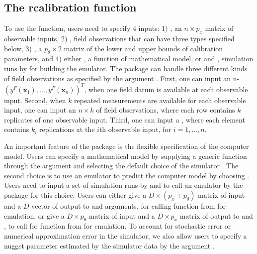  \subsection{The rcalibration function} 
To use the   function, users need to specify 4 inputs: 1) , an $n\times p_x$ matrix of observable inputs, 2) , field observations that can have three types specified below,  3) , a $p_{\theta}\times 2$ matrix of the lower and upper bounds of calibration parameters, and 4) either , a function of mathematical model, or  and , simulation runs by for building the emulator. The  package can handle three different kinds of field observations as specified by the argument . First, one can input an n- $(y^F(\mathbf x_1),...,y^F(\mathbf x_n))^T$, when one field datum is available at each observable input. Second, when $k$ repeated measurements are available for each observable input, one can input an $n\times k$  of field observations, where each row contains $k$ replicates of one observable input. Third, one can input a , where each element contains  $k_i$ replications at the $i$th observable input, for $i=1,...,n$. 


An important feature of the  package is the flexible specification of the computer model. Users can  specify a  mathematical model by supplying a generic  function through the argument  and  selecting the default choice of the simulator . The second choice is to use an emulator to predict the computer model by choosing . Users need to input a  set of simulation runs by  and  to call an emulator by the  package for this choice.  {Users can either give  a $D\times (p_x+p_{\theta})$ matrix of input and a $D$-vector of output  to  and  arguments, for calling  function from  for emulation,  or give  a  $D \times p_{\theta} $ matrix of input and a $D\times p_x $ matrix of output to  and , to call for  function from   for emulation}. To account for stochastic error or numerical approximation error in the simulator, we also allow users to specify a nugget parameter estimated by the simulator data by the argument . 


